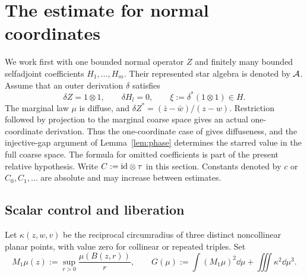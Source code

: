 \section{The estimate for normal coordinates}\label{sec:estimate}
We work first with one bounded normal operator $Z$ and finitely many bounded selfadjoint coefficients $H_1,\ldots,H_m$.
Their represented star algebra is denoted by $\mathcal A$.
Assume that an outer derivation $\delta$ satisfies
\[
 \delta Z=1\otimes1,\qquad \delta H_l=0,\qquad
 \xi:=\delta^*(1\otimes1)\in H.
\]
The marginal law $\mu$ is diffuse, and $\delta Z^*=(\bar z-\bar w)/(z-w)$.
Restriction followed by projection to the marginal coarse space gives an actual one-coordinate derivation.
Thus the one-coordinate case of \cite[Proposition~3.5]{ACSY24} gives diffuseness, and the injective-gap argument of Lemma~\ref{lem:phase} determines the starred value in the full coarse space.
The formula for omitted coefficients is part of the present relative hypothesis.
Write $C:=\mathrm{id}\otimes\tau$ in this section.
Constants denoted by $c$ or $C_0,C_1,\ldots$ are absolute and may increase between estimates.

\subsection{Scalar control and liberation}
Let $\kappa(z,w,v)$ be the reciprocal circumradius of three distinct noncollinear planar points, with value zero for collinear or repeated triples.
Set
\begin{equation}\label{eq:scalar-budget}
 M_1\mu(z):=\sup_{r>0}\frac{\mu(B(z,r))}{r},\qquad
 G(\mu):=\int(M_1\mu)^2\dd\mu+\iiint\kappa^2\dd\mu^3.
\end{equation}

